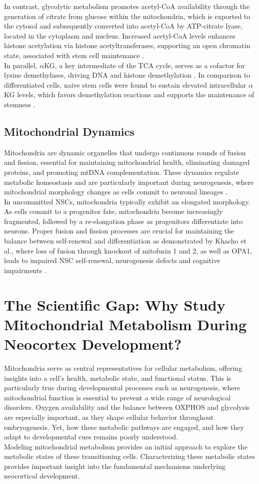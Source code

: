 In contrast, glycolytic metabolism promotes acetyl-CoA availability through the generation of citrate from glucose within the mitochondria, which is exported to the cytosol and subsequently converted into acetyl-CoA by ATP-citrate lyase, located in the cytoplasm and nucleus. Increased acetyl-CoA levels enhances histone acetylation via histone acetyltransferases, supporting an open chromatin state, associated with stem cell maintenance \citep{wellenATPCitrateLyaseLinks2009}.
\\

In parallel, $\alpha$KG, a key intermediate of the TCA cycle, serves as a cofactor for lysine demethylases, driving DNA and histone demethylation \citep{kaelinInfluenceMetabolismEpigenetics2013}.
In comparison to differentiated cells, naive stem cells were found to sustain elevated intracellular  $\alpha$KG levels, which favors demethylation reactions and supports the maintenance of stemness \citep{careyIntracellularAketoglutarateMaintains2015}.

\subsection{Mitochondrial Dynamics}
Mitochondria are dynamic organelles that undergo continuous rounds of fusion and fission, essential for maintaining mitochondrial health, eliminating damaged proteins, and promoting mtDNA complementation. These dynamics regulate metabolic homeostasis and are particularly important during neurogenesis, where mitochondrial morphology changes as cells commit to neuronal lineages \citep{KHACHOMitochondrialDynamicsImpacts2016,IWATAMitochondrialDynamicsPostmitotic2020}.
\\

In uncommitted NSCs, mitochondria typically exhibit an elongated morphology. As cells commit to a progenitor fate, mitochondria become increasingly fragmented, followed by a re-elongation phase as progenitors differentiate into neurons. Proper fusion and fission processes are crucial for maintaining the balance between self-renewal and differentiation as demonstrated by Khacho et al., where loss of fusion through knockout of mitofusin 1 and 2, as well as OPA1, leads to impaired NSC self-renewal, neurogenesis defects and cognitive impairments \citep{KHACHOMitochondrialDynamicsImpacts2016}.

\section{The Scientific Gap: Why Study Mitochondrial Metabolism During Neocortex Development?}
Mitochondria serve as central representatives for cellular metabolism, offering insights into a cell’s health, metabolic state, and functional status. This is particularly true during developmental processes such as neurogenesis, where mitochondrial function is essential to prevent a wide range of neurological disorders. Oxygen availability and the balance between OXPHOS and glycolysis are especially important, as they  shape cellular behavior throughout embryogenesis. Yet, how these metabolic pathways are engaged, and how they adapt to developmental cues remains poorly understood. 
\\

Modeling mitochondrial metabolism provides an initial approach to explore the metabolic states of these transitioning cells. Characterizing these metabolic states provides important insight into the fundamental mechanisms underlying neocortical development. 
